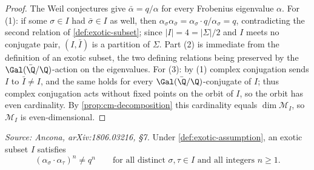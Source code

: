 \begin{proof}
  The Weil conjectures give \(\bar\alpha = q/\alpha\) for every Frobenius
  eigenvalue \(\alpha\). For (1): if some \(\sigma \in I\) had
  \(\bar\sigma \in I\) as well, then \(\alpha_\sigma \alpha_{\bar\sigma}
  = \alpha_\sigma \cdot q/\alpha_\sigma = q\), contradicting the second relation
  of \cref{def:exotic-subset}; since \(|I| = 4 = |\Sigma|/2\) and \(I\) meets no
  conjugate pair, \((I, \bar I)\) is a partition of \(\Sigma\). Part (2) is
  immediate from the definition of an exotic subset, the two defining relations
  being preserved by the \(\Gal(\bar\Q/\Q)\)-action on the eigenvalues. For (3):
  by (1) complex conjugation sends \(I\) to \(\bar I \neq I\), and the same holds
  for every \(\Gal(\bar\Q/\Q)\)-conjugate of \(I\); thus complex conjugation acts
  without fixed points on the orbit of \(I\), so the orbit has even cardinality.
  By \cref{prop:cm-decomposition} this cardinality equals
  \(\dim \mathcal{M}_I\), so \(\mathcal{M}_I\) is even-dimensional.
\end{proof}

\begin{lemma}
  \label{lem:exotic-frobenius-power}
  \textit{Source: Ancona, arXiv:1806.03216, §7.}
  Under \cref{def:exotic-assumption}, an exotic subset \(I\) satisfies
  \[(\alpha_\sigma \cdot \alpha_\tau)^n \neq q^n
    \qquad \text{for all distinct } \sigma, \tau \in I
    \text{ and all integers } n \ge 1.\]
\end{lemma}

